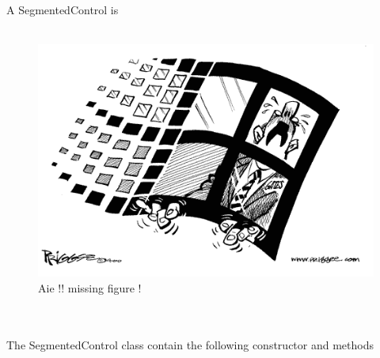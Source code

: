 \documentclass[a4paper,11pt]{extarticle}
\begin{document}
~\\ A SegmentedControl is 
~\\
~\\

\begin{figure}[htbp]
   \centering
   \includegraphics[scale=0.55]{AWFig.png} 
   \caption{Aie !! missing figure !}
   \label{fig:11}
\end{figure}

~\\

~\\ The SegmentedControl class contain the following constructor and methods
\end{document}
